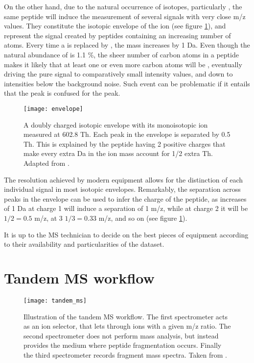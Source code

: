 On the other hand, due to the natural occurrence of isotopes, particularly , the same peptide will induce the measurement of several signals with very close \ac{m/z} values. They constitute the isotopic envelope of the ion (see figure \ref{fig:envelope}), and represent the signal created by peptides containing an increasing number of  atoms. Every time a  is replaced by , the mass increases by 1 Da. Even though the natural abundance of  is 1.1 \%, the sheer number of carbon atoms in a peptide makes it likely that at least one or even more carbon atoms will be , eventually driving the pure  signal to comparatively small intensity values, and down to intensities below the background noise. Such event can be problematic if it entails that the  peak is confused for the  peak.

\begin{figure}[!h]
\texttt{[image: envelope]}
\caption{A doubly charged isotopic envelope with its monoisotopic ion measured at 602.8 Th. Each peak in the envelope is separated by 0.5 Th. This is explained by the peptide having 2 positive charges that make every extra Da in the ion mass account for 1/2 extra Th. Adapted from \cite{Mirzaei2016}.}
\label{fig:envelope}
\end{figure}


The resolution achieved by modern equipment allows for the distinction of each individual signal in most isotopic envelopes. Remarkably, the separation across peaks in the envelope can be used to infer the charge of the peptide, as increases of 1 Da at charge 1 will induce a separation of 1 \ac{m/z}, while at charge 2 it will be $1/2 = 0.5$ \ac{m/z}, at 3 $1/3 = 0.33$ \ac{m/z}, and so on (see figure \ref{fig:envelope}).

It is up to the \ac{MS} technician to decide on the best pieces of equipment according to their availability and particularities of the dataset.

\section{Tandem MS workflow}
\label{sec:tandem_ms_workflow}

\begin{figure}[!h]
\texttt{[image: tandem\_ms]}
\caption[]{Illustration of the tandem MS workflow. The first spectrometer acts as an ion selector, that lets through ions with a given \ac{m/z} ratio. The second spectrometer does not perform mass analysis, but instead provides the medium where peptide fragmentation occurs. Finally the third spectrometer records fragment mass spectra. Taken from \footnotemark{}.}
\label{fig:tandem_ms}
\end{figure}

